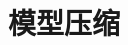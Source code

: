 \setcounter{chapter}{17}

\hypertarget{ux6a21ux578bux538bux7f29}{%
\chapter{模型压缩}\label{ux6a21ux578bux538bux7f29}}
